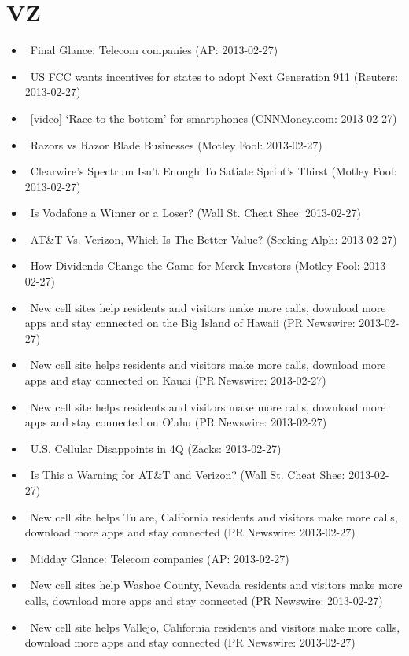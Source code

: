 \documentclass[11pt,asymmetric]{article}
\begin{document}
\section*{VZ}
\begin{itemize}
\item\ Final Glance: Telecom companies (AP: 2013-02-27)
\item\ US FCC wants incentives for states to adopt Next Generation 911 (Reuters: 2013-02-27)
\item\ [video] `Race to the bottom' for smartphones (CNNMoney.com: 2013-02-27)
\item\ Razors vs Razor Blade Businesses (Motley Fool: 2013-02-27)
\item\ Clearwire’s Spectrum Isn't Enough To Satiate Sprint’s Thirst (Motley Fool: 2013-02-27)
\item\ Is Vodafone a Winner or a Loser? (Wall St. Cheat Shee: 2013-02-27)
\item\ AT\&T Vs. Verizon, Which Is The Better Value? (Seeking Alph: 2013-02-27)
\item\ How Dividends Change the Game for Merck Investors (Motley Fool: 2013-02-27)
\item\ New cell sites help residents and visitors make more calls, download more apps and stay connected on the Big Island of Hawaii (PR Newswire: 2013-02-27)
\item\ New cell site helps residents and visitors make more calls, download more apps and stay connected on Kauai (PR Newswire: 2013-02-27)
\item\ New cell site helps residents and visitors make more calls, download more apps and stay connected on O'ahu (PR Newswire: 2013-02-27)
\item\ U.S. Cellular Disappoints in 4Q (Zacks: 2013-02-27)
\item\ Is This a Warning for AT\&T and Verizon? (Wall St. Cheat Shee: 2013-02-27)
\item\ New cell site helps Tulare, California residents and visitors make more calls, download more apps and stay connected (PR Newswire: 2013-02-27)
\item\ Midday Glance: Telecom companies (AP: 2013-02-27)
\item\ New cell sites help Washoe County, Nevada residents and visitors make more calls, download more apps and stay connected (PR Newswire: 2013-02-27)
\item\ New cell site helps Vallejo, California residents and visitors make more calls, download more apps and stay connected (PR Newswire: 2013-02-27)

\end{itemize}
\end{document}
